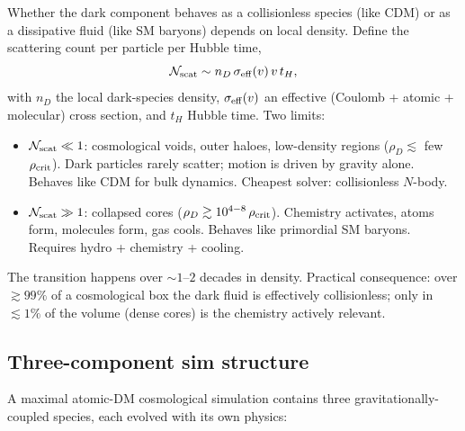 \documentclass[12pt]{article}
\begin{document}
Whether the dark component behaves as a collisionless species (like
CDM) or as a dissipative fluid (like SM baryons) depends on local
density.  Define the scattering count per particle per Hubble time,
%
\begin{equation}
  \mathcal{N}_{\rm scat}
    \sim n_D\,\sigma_{\rm eff}(v)\,v\,t_H,
\end{equation}
%
with $n_D$ the local dark-species density, $\sigma_{\rm eff}(v)$ an
effective (Coulomb + atomic + molecular) cross section, and $t_H$
Hubble time.  Two limits:
%
\begin{itemize}
  \item $\mathcal{N}_{\rm scat}\ll 1$: cosmological voids, outer
        haloes, low-density regions ($\rho_D \lesssim$ few
        $\rho_{\rm crit}$).  Dark particles rarely scatter; motion is
        driven by gravity alone.  Behaves like CDM for bulk dynamics.
        Cheapest solver: collisionless $N$-body.
  \item $\mathcal{N}_{\rm scat}\gg 1$: collapsed cores
        ($\rho_D \gtrsim 10^{4-8}\,\rho_{\rm crit}$).  Chemistry
        activates, atoms form, molecules form, gas cools.
        Behaves like primordial SM baryons.  Requires hydro + chemistry
        + cooling.
\end{itemize}
%
The transition happens over $\sim\!1$--$2$ decades in density.
Practical consequence: over $\gtrsim 99\%$ of a cosmological box the
dark fluid is effectively collisionless; only in $\lesssim 1\%$ of
the volume (dense cores) is the chemistry actively relevant.

\subsection{Three-component sim structure}
\label{sec:three_component}

A maximal atomic-DM cosmological simulation contains three
gravitationally-coupled species, each evolved with its own physics:
\end{document}
